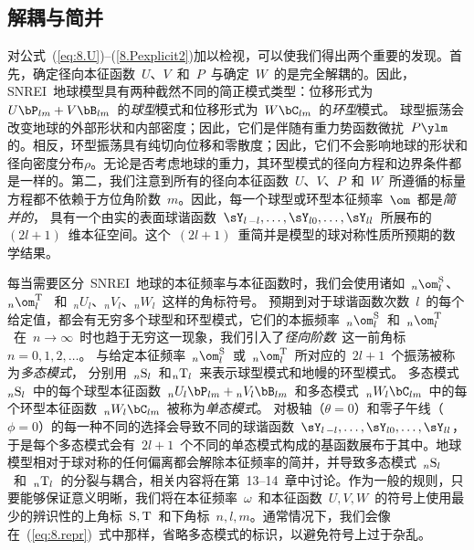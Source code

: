\subsection{解耦与简并}
%
%

对公式~(\ref{eq:8.U})--(\ref{8.Pexplicit2})加以检视，可以使我们得出两个重要的发现。首先，确定径向本征函数~$U$、$V$~和~$P$~与确定~$W$~的是完全解耦的。因此，SNREI~地球模型具有两种截然不同的简正模式类型：位移形式为~$U\bP_{lm}+V\bB_{lm}$~的{\em 球型\/}模式和位移形式为~$W\bC_{lm}$~的{\em 环型\/}模式。
%
%
%
%
球型振荡会改变地球的外部形状和内部密度；因此，它们是伴随有重力势函数微扰~$P\ylm$的。相反，环型振荡具有纯切向位移和零散度；因此，它们不会影响地球的形状和径向密度分布$\rho$。无论是否考虑地球的重力，其环型模式的径向方程和边界条件都是一样的。第二，我们注意到所有的径向本征函数~$U$、$V$、$P$~和~$W$~所遵循的标量方程都不依赖于方位角阶数~$m$。因此，每一个球型或环型本征频率~$\om$~都是{\em 简并的\/}，
%
具有一个由实的表面球谐函数~$\sY_{l\,-l},\ldots,
\sY_{l0},\ldots,\sY_{ll}$~所展布的~$(2l+1)$~维本征空间。这个~$(2l+1)$~重简并是模型的球对称性质所预期的数学结果。

每当需要区分~SNREI~地球的本征频率与本征函数时，我们会使用诸如~${}_n\om_l^{\rm S}$、${}_n\om_l^{\rm T}$~
和~${}_nU_l$、${}_nV_l$、${}_nW_l$~这样的角标符号。
预期到对于球谐函数次数~$l$~的每个给定值，都会有无穷多个球型和环型模式，它们的本振频率~${}_n\om_l^{\rm S}$~和~${}_n\om_l^{\rm T}$~在~$n\rightarrow\infty$~时也趋于无穷这一现象，我们引入了{\em 径向阶数\/}~这一前角标$n=0,1,2,\ldots$。
%
与给定本征频率~${}_n\om_l^{\rm S}$~或~${}_n\om_l^{\rm T}$~所对应的~$2l+1$~个振荡被称为{\em 多态模式\/}，
%
分别用~${}_n{\rm S}_l$~和${}_n{\rm T}_l$~来表示球型模式和地幔的环型模式。
多态模式~${}_n{\rm S}_l$~中的每个球型本征函数~${}_nU_l\bP_{lm}+{}_nV_l\bB_{lm}$~和多态模式~${}_nW_l\bC_{lm}$~中的每个环型本征函数~${}_nW_l\bC_{lm}$~被称为{\em 单态模式\/}。
%
对极轴（$\theta=0$）和零子午线（$\phi=0$）的每一种不同的选择会导致不同的球谐函数~$\sY_{l\,-l},\ldots,
\sY_{l0},\ldots,\sY_{ll}$，于是每个多态模式会有~$2l+1$~个不同的单态模式构成的基函数展布于其中。地球模型相对于球对称的任何偏离都会解除本征频率的简并，并导致多态模式~${}_n{\rm S}_l$~和~${}_n{\rm T}_l$~的分裂与耦合，相关内容将在第~13--14~章中讨论。作为一般的规则，只要能够保证意义明晰，我们将在本征频率~$\omega$~和本征函数~$U,V,W$~的符号上使用最少的辨识性的上角标~${\rm S},{\rm T}$~和下角标~$n,l,m$。通常情况下，我们会像在~(\ref{eq:8.repr})~式中那样，省略多态模式的标识，以避免符号上过于杂乱。
%
%

